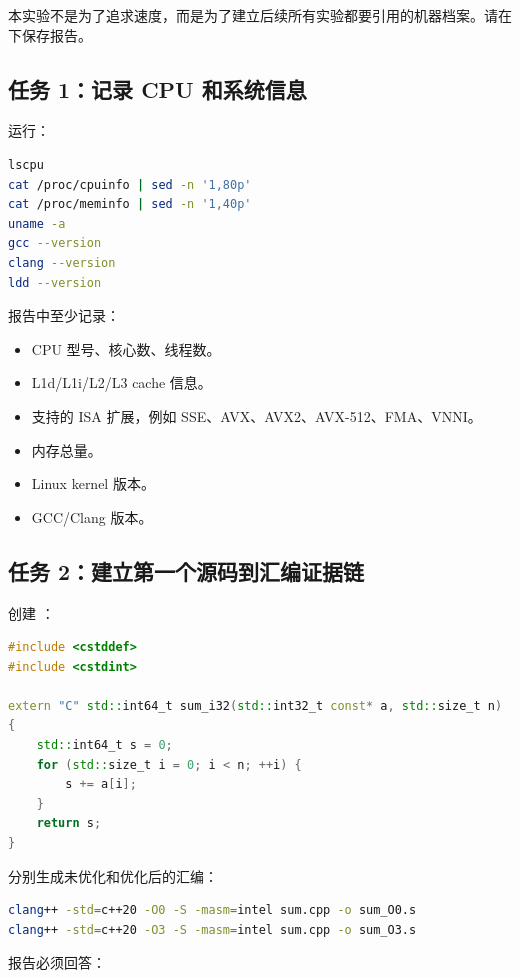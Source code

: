 \begin{labbox}
本实验不是为了追求速度，而是为了建立后续所有实验都要引用的机器档案。请在  下保存报告。

\subsection*{任务 1：记录 CPU 和系统信息}

运行：

\begin{lstlisting}[language=bash]
lscpu
cat /proc/cpuinfo | sed -n '1,80p'
cat /proc/meminfo | sed -n '1,40p'
uname -a
gcc --version
clang --version
ldd --version
\end{lstlisting}

报告中至少记录：

\begin{itemize}
  \item CPU 型号、核心数、线程数。
  \item L1d/L1i/L2/L3 cache 信息。
  \item 支持的 ISA 扩展，例如 SSE、AVX、AVX2、AVX-512、FMA、VNNI。
  \item 内存总量。
  \item Linux kernel 版本。
  \item GCC/Clang 版本。
\end{itemize}

\subsection*{任务 2：建立第一个源码到汇编证据链}

创建 ：

\begin{lstlisting}[language=C++]
#include <cstddef>
#include <cstdint>

extern "C" std::int64_t sum_i32(std::int32_t const* a, std::size_t n)
{
    std::int64_t s = 0;
    for (std::size_t i = 0; i < n; ++i) {
        s += a[i];
    }
    return s;
}
\end{lstlisting}

分别生成未优化和优化后的汇编：

\begin{lstlisting}[language=bash]
clang++ -std=c++20 -O0 -S -masm=intel sum.cpp -o sum_O0.s
clang++ -std=c++20 -O3 -S -masm=intel sum.cpp -o sum_O3.s
\end{lstlisting}

报告必须回答：


\end{labbox}
